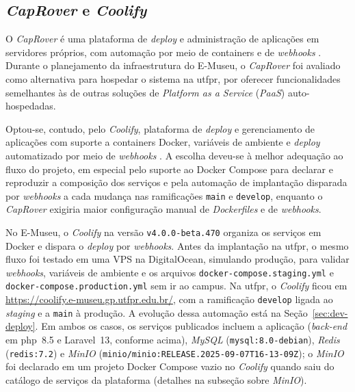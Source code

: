 \subsection{\textit{CapRover} e \textit{Coolify}}\label{sec:materiais-coolify}

O \textit{CapRover} é uma plataforma de \textit{deploy} e administração de aplicações em servidores próprios, com automação por meio de containers e de \textit{webhooks} \cite{caprover}. Durante o planejamento da infraestrutura do E-Museu, o \textit{CapRover} foi avaliado como alternativa para hospedar o sistema na \acrshort{utfpr}, por oferecer funcionalidades semelhantes às de outras soluções de \textit{Platform as a Service} (\textit{PaaS}) auto-hospedadas.

Optou-se, contudo, pelo \textit{Coolify}, plataforma de \textit{deploy} e gerenciamento de aplicações com suporte a containers Docker, variáveis de ambiente e \textit{deploy} automatizado por meio de \textit{webhooks} \cite{coolify}. A escolha deveu-se à melhor adequação ao fluxo do projeto, em especial pelo suporte ao Docker Compose para declarar e reproduzir a composição dos serviços e pela automação de implantação disparada por \textit{webhooks} a cada mudança nas ramificações \texttt{main} e \texttt{develop}, enquanto o \textit{CapRover} exigiria maior configuração manual de \textit{Dockerfiles} e de \textit{webhooks}.

No E-Museu, o \textit{Coolify} na versão \texttt{v4.0.0-beta.470} organiza os serviços em Docker e dispara o \textit{deploy} por \textit{webhooks}. Antes da implantação na \acrshort{utfpr}, o mesmo fluxo foi testado em uma VPS na DigitalOcean, simulando produção, para validar \textit{webhooks}, variáveis de ambiente e os arquivos \texttt{docker-compose.staging.yml} e \texttt{docker-compose.production.yml} sem ir ao campus. Na \acrshort{utfpr}, o \textit{Coolify} ficou em \url{https://coolify.e-museu.gp.utfpr.edu.br/}, com a ramificação \texttt{develop} ligada ao \textit{staging} e a \texttt{main} à produção. A evolução dessa automação está na Seção~\ref{sec:dev-deploy}. Em ambos os casos, os serviços publicados incluem a aplicação (\textit{back-end} em \acrshort{php}~8.5 e Laravel~13, conforme acima), \textit{MySQL} (\texttt{mysql:8.0-debian}), \textit{Redis} (\texttt{redis:7.2}) e \textit{MinIO} (\texttt{minio/minio:RELEASE.2025-09-07T16-13-09Z}); o \textit{MinIO} foi declarado em um projeto Docker Compose vazio no \textit{Coolify} quando saiu do catálogo de serviços da plataforma (detalhes na subseção sobre \textit{MinIO}).


